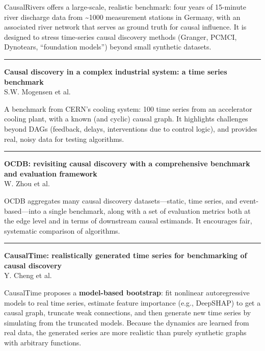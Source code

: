 \documentclass[a5paper]{article}
\begin{document}
CausalRivers offers a large-scale, realistic benchmark: four years of
15-minute river discharge data from \textasciitilde1000 measurement
stations in Germany, with an associated river network that serves as
ground truth for causal influence. It is designed to stress time-series
causal discovery methods (Granger, PCMCI, Dynotears, ``foundation
models'') beyond small synthetic datasets.

\begin{center}\rule{0.5\linewidth}{0.5pt}\end{center}

\textbf{Causal discovery in a complex industrial system: a time series
benchmark}\\
S.W. Mogensen et al.

A benchmark from CERN's cooling system: 100 time series from an
accelerator cooling plant, with a known (and cyclic) causal graph. It
highlights challenges beyond DAGs (feedback, delays, interventions due
to control logic), and provides real, noisy data for testing algorithms.

\begin{center}\rule{0.5\linewidth}{0.5pt}\end{center}

\textbf{OCDB: revisiting causal discovery with a comprehensive benchmark
and evaluation framework}\\
W. Zhou et al.

OCDB aggregates many causal discovery datasets---static, time series,
and event-based---into a single benchmark, along with a set of
evaluation metrics both at the edge level and in terms of downstream
causal estimands. It encourages fair, systematic comparison of
algorithms.

\begin{center}\rule{0.5\linewidth}{0.5pt}\end{center}

\textbf{CausalTime: realistically generated time series for benchmarking
of causal discovery}\\
Y. Cheng et al.

CausalTime proposes a \textbf{model-based bootstrap}: fit nonlinear
autoregressive models to real time series, estimate feature importance
(e.g., DeepSHAP) to get a causal graph, truncate weak connections, and
then generate new time series by simulating from the truncated models.
Because the dynamics are learned from real data, the generated series
are more realistic than purely synthetic graphs with arbitrary
functions.
\end{document}
